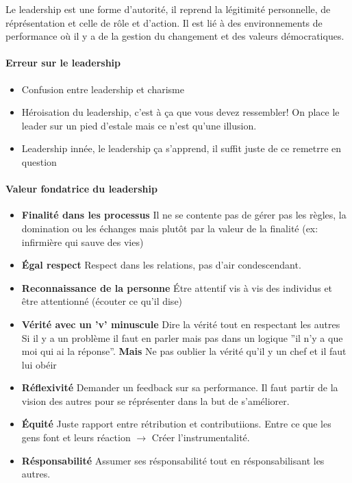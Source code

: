\documentclass[11pt]{article} %
\begin{document}
Le leadership est une forme d'autorité, il reprend la légitimité
personnelle, de réprésentation et celle de rôle et d'action. Il est
lié à des environnements de performance où il y a de la gestion du
changement et des valeurs démocratiques.

\paragraph{Erreur sur le leadership}
\begin{itemize}

    \item{Confusion entre leadership et charisme}

    \item{Héroisation du leadership}, c'est à ça que vous devez      
    ressembler! On place le leader sur un pied d'estale mais ce n'est   
    qu'une illusion.                                                    

    \item{Leadership innée}, le leadership ça s'apprend, il suffit
juste de ce remetrre en question

\end{itemize}

\paragraph{Valeur fondatrice du leadership}

\begin{itemize}

    \item \textbf{Finalité dans les processus} Il ne se contente pas de gérer
    pas les règles, la domination ou les échanges mais plutôt par la
    valeur de la finalité (ex: infirmière qui sauve des vies)

    \item \textbf{Égal respect} Respect dans les relations, pas d'air
condescendant.

    \item \textbf{Reconnaissance de la personne} Étre attentif vis à vis des
    individus et être attentionné (écouter ce qu'il dise)

    \item \textbf{Vérité avec un 'v' minuscule} Dire la vérité tout en
    respectant les autres Si il y a un problème il faut en parler
    mais pas dans un logique ''il n'y a que moi qui ai la réponse''.
    \textbf{Mais} Ne pas oublier la vérité qu'il y un chef et il faut
    lui obéir

    \item \textbf{Réflexivité} Demander un feedback sur sa performance. Il
    faut partir de la vision des autres pour se réprésenter dans la
    but de s'améliorer.

    \item \textbf{Équité} Juste rapport entre rétribution et contributiions.
    Entre ce que les gens font et leurs réaction $\to$ Créer
    l'instrumentalité.

    \item \textbf{Résponsabilité} Assumer ses résponsabilité tout en
résponsabilisant les autres.
\end{itemize}
\end{document}
